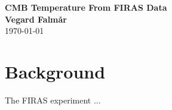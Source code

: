 \documentclass[a4paper,onecolumn,12pt]{revtex4-1}
\begin{document}
\begin{center}
{\bf \Large CMB Temperature From FIRAS Data\\}
{\bf Vegard Falmår\\}
\today
\end{center}





\section{Background}

The FIRAS experiment ...
\end{document}
